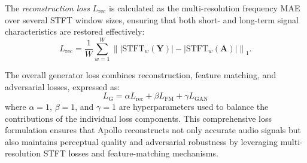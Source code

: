 The \textit{reconstruction loss} $L_{\text{rec}}$ is calculated as the multi-resolution frequency MAE over several STFT window sizes, ensuring that both short- and long-term signal characteristics are restored effectively:
\begin{equation}
    L_{\text{rec}} = \frac{1}{W} \sum_{w=1}^{W} \left\| |\text{STFT}_{w}(\mathbf{Y})| - |\text{STFT}_{w}(\mathbf{A})| \right\|_1.
\end{equation}

The overall generator loss combines reconstruction, feature matching, and adversarial losses, expressed as:
\begin{equation}
    L_{\text{G}} = \alpha L_{\text{rec}} + \beta L_{\text{FM}} + \gamma L_{\text{GAN}}
\end{equation}
where $\alpha=1$, $\beta=1$, and $\gamma=1$ are hyperparameters used to balance the contributions of the individual loss components. This comprehensive loss formulation ensures that Apollo reconstructs not only accurate audio signals but also maintains perceptual quality and adversarial robustness by leveraging multi-resolution STFT losses and feature-matching mechanisms.